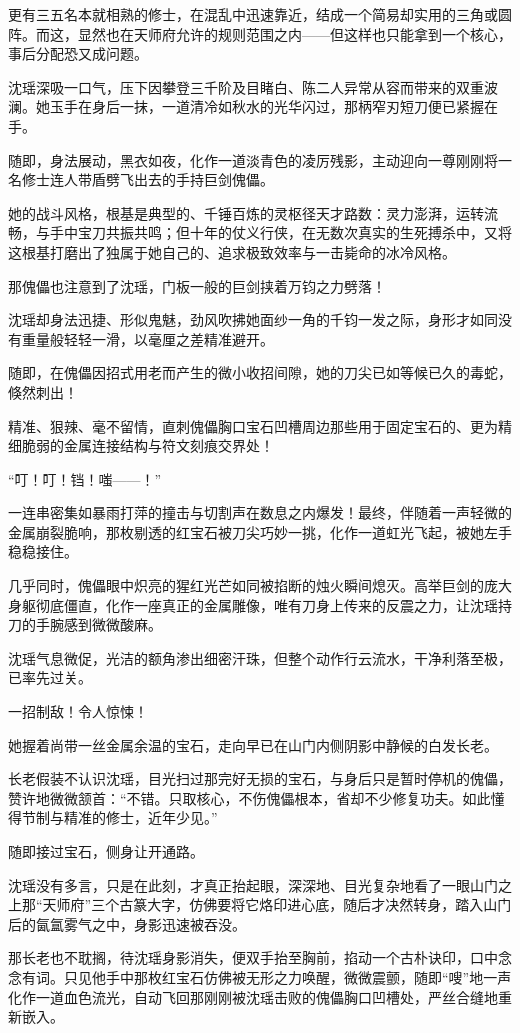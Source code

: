 更有三五名本就相熟的修士，在混乱中迅速靠近，结成一个简易却实用的三角或圆阵。而这，显然也在天师府允许的规则范围之内——但这样也只能拿到一个核心，事后分配恐又成问题。

沈瑶深吸一口气，压下因攀登三千阶及目睹白、陈二人异常从容而带来的双重波澜。她玉手在身后一抹，一道清冷如秋水的光华闪过，那柄窄刃短刀便已紧握在手。

随即，身法展动，黑衣如夜，化作一道淡青色的凌厉残影，主动迎向一尊刚刚将一名修士连人带盾劈飞出去的手持巨剑傀儡。

她的战斗风格，根基是典型的、千锤百炼的灵枢径天才路数：灵力澎湃，运转流畅，与手中宝刀共振共鸣；但十年的仗义行侠，在无数次真实的生死搏杀中，又将这根基打磨出了独属于她自己的、追求极致效率与一击毙命的冰冷风格。

那傀儡也注意到了沈瑶，门板一般的巨剑挟着万钧之力劈落！

沈瑶却身法迅捷、形似鬼魅，劲风吹拂她面纱一角的千钧一发之际，身形才如同没有重量般轻轻一滑，以毫厘之差精准避开。

随即，在傀儡因招式用老而产生的微小收招间隙，她的刀尖已如等候已久的毒蛇，倏然刺出！

精准、狠辣、毫不留情，直刺傀儡胸口宝石凹槽周边那些用于固定宝石的、更为精细脆弱的金属连接结构与符文刻痕交界处！

“叮！叮！铛！嗤——！”

一连串密集如暴雨打萍的撞击与切割声在数息之内爆发！最终，伴随着一声轻微的金属崩裂脆响，那枚剔透的红宝石被刀尖巧妙一挑，化作一道虹光飞起，被她左手稳稳接住。

几乎同时，傀儡眼中炽亮的猩红光芒如同被掐断的烛火瞬间熄灭。高举巨剑的庞大身躯彻底僵直，化作一座真正的金属雕像，唯有刀身上传来的反震之力，让沈瑶持刀的手腕感到微微酸麻。

沈瑶气息微促，光洁的额角渗出细密汗珠，但整个动作行云流水，干净利落至极，已率先过关。

一招制敌！令人惊悚！

她握着尚带一丝金属余温的宝石，走向早已在山门内侧阴影中静候的白发长老。

长老假装不认识沈瑶，目光扫过那完好无损的宝石，与身后只是暂时停机的傀儡，赞许地微微颔首：“不错。只取核心，不伤傀儡根本，省却不少修复功夫。如此懂得节制与精准的修士，近年少见。”

随即接过宝石，侧身让开通路。

沈瑶没有多言，只是在此刻，才真正抬起眼，深深地、目光复杂地看了一眼山门之上那“天师府”三个古篆大字，仿佛要将它烙印进心底，随后才决然转身，踏入山门后的氤氲雾气之中，身影迅速被吞没。

那长老也不耽搁，待沈瑶身影消失，便双手抬至胸前，掐动一个古朴诀印，口中念念有词。只见他手中那枚红宝石仿佛被无形之力唤醒，微微震颤，随即“嗖”地一声化作一道血色流光，自动飞回那刚刚被沈瑶击败的傀儡胸口凹槽处，严丝合缝地重新嵌入。

